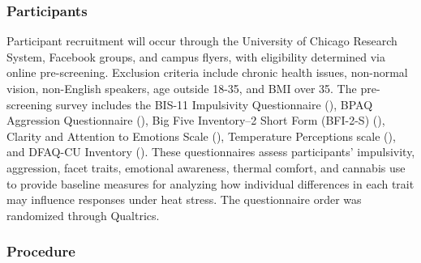 \documentclass[
  man,
  floatsintext,
  longtable,
  nolmodern,
  notxfonts,
  notimes,
  colorlinks=true,linkcolor=blue,citecolor=blue,urlcolor=blue]{apa7}
\begin{document}
\subsubsection{Participants}\label{participants}

Participant recruitment will occur through the University of Chicago
Research System, Facebook groups, and campus flyers, with eligibility
determined via online pre-screening. Exclusion criteria include chronic
health issues, non-normal vision, non-English speakers, age outside
18-35, and BMI over 35. The pre-screening survey includes the BIS-11
Impulsivity Questionnaire
(),
BPAQ Aggression Questionnaire
(),
Big Five Inventory--2 Short Form (BFI-2-S)
(),
Clarity and Attention to Emotions Scale
(), Temperature Perceptions scale
(), and DFAQ-CU Inventory
(). These questionnaires assess participants' impulsivity,
aggression, facet traits, emotional awareness, thermal comfort, and
cannabis use to provide baseline measures for analyzing how individual
differences in each trait may influence responses under heat stress. The
questionnaire order was randomized through Qualtrics.

\subsubsection{Procedure}\label{procedure}
\end{document}
